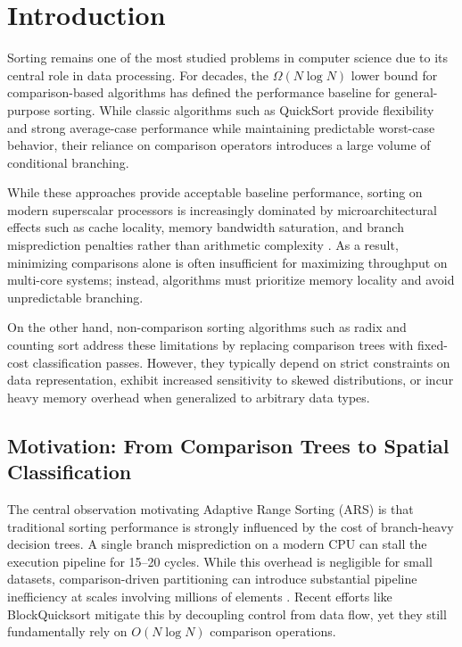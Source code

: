 \section{Introduction}
Sorting remains one of the most studied problems in computer science due to its central role in data processing.
For decades, the $\Omega(N \log N)$ lower bound for comparison-based algorithms has defined the performance baseline for general-purpose sorting.
While classic algorithms such as QuickSort \cite{10.1093/comjnl/5.1.10} provide flexibility and strong average-case performance while maintaining predictable worst-case behavior, their reliance on comparison operators introduces a large volume of conditional branching.

While these approaches provide acceptable baseline performance, sorting on modern superscalar processors is increasingly dominated by microarchitectural effects such as cache locality, memory bandwidth saturation, and branch misprediction penalties rather than arithmetic complexity \cite{frigoCacheobliviousAlgorithms1999b, wulfHittingMemoryWall1995}.
As a result, minimizing comparisons alone is often insufficient for maximizing throughput on multi-core systems; instead, algorithms must prioritize memory locality and avoid unpredictable branching.

On the other hand, non-comparison sorting algorithms such as radix and counting sort \cite{cormenIntroductionAlgorithms2022} address these limitations by replacing comparison trees with fixed-cost classification passes.
However, they typically depend on strict constraints on data representation, exhibit increased sensitivity to skewed distributions, or incur heavy memory overhead when generalized to arbitrary data types.

\subsection{Motivation: From Comparison Trees to Spatial Classification}
The central observation motivating Adaptive Range Sorting (ARS) is that traditional sorting performance is strongly influenced by the cost of branch-heavy decision trees.
A single branch misprediction on a modern CPU can stall the execution pipeline for 15--20 cycles.
While this overhead is negligible for small datasets, comparison-driven partitioning can introduce substantial pipeline inefficiency at scales involving millions of elements \cite{kaligosiHowBranchMispredictions2006}. Recent efforts like BlockQuicksort \cite{edelkampBlockQuicksortHowBranch2016} mitigate this by decoupling control from data flow, yet they still fundamentally rely on $O(N \log N)$ comparison operations.

